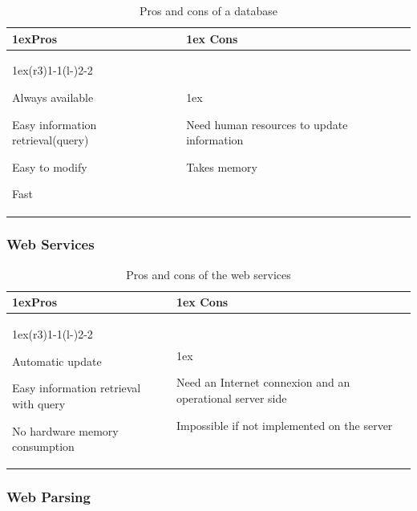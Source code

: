 \documentclass{eplmastersthesis}
\begin{document}
\begin{table}[H]
\begin{tabularx}{\linewidth}{>{\parskip1ex}X@{\kern4\tabcolsep}>{\parskip1ex}X}
\toprule
\hfil\bfseries Pros
&
\hfil\bfseries Cons
\\\cmidrule(r{3\tabcolsep}){1-1}\cmidrule(l{-\tabcolsep}){2-2}

Always available\par
Easy information retrieval(query)\par
Easy to modify\par
Fast\par

&

Need human resources to update information\par
Takes memory \par


\\\bottomrule
\end{tabularx}
\caption{Pros and cons of a database}
\end{table}

\subsubsection{Web Services}

\begin{table}[H]
\begin{tabularx}{\linewidth}{>{\parskip1ex}X@{\kern4\tabcolsep}>{\parskip1ex}X}
\toprule
\hfil\bfseries Pros
&
\hfil\bfseries Cons
\\\cmidrule(r{3\tabcolsep}){1-1}\cmidrule(l{-\tabcolsep}){2-2}

Automatic update\par
Easy information retrieval with query\par
No hardware memory consumption\par

&

Need an Internet connexion and an operational server side\par
Impossible if not implemented on the server\par

\\\bottomrule
\end{tabularx}
\caption{Pros and cons of the web services}
\end{table}

\subsubsection{Web Parsing}
\end{document}
